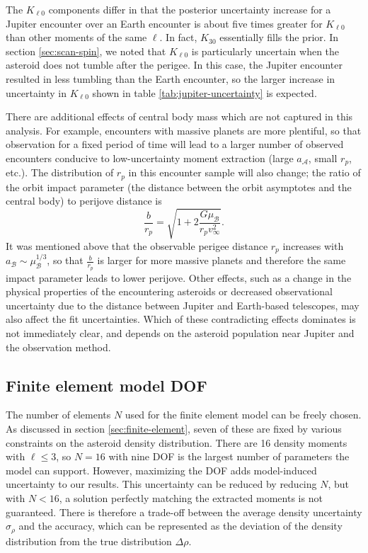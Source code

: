 \documentclass[fleqn,usenatbib]{mnras}
\begin{document}
The $K_{\ell 0}$ components differ in that the posterior uncertainty increase for a Jupiter encounter over an Earth encounter is about five times greater for $K_{\ell 0}$ than other moments of the same $\ell$. In fact, $K_{30}$ essentially fills the prior. In section \ref{sec:scan-spin}, we noted that $K_{\ell 0}$ is particularly uncertain when the asteroid does not tumble after the perigee. In this case, the Jupiter encounter resulted in less tumbling than the Earth encounter, so the larger increase in uncertainty in $K_{\ell 0}$ shown in table \ref{tab:jupiter-uncertainty} is expected.

There are additional effects of central body mass which are not captured in this analysis. For example, encounters with massive planets are more plentiful, so that observation for a fixed period of time will lead to a larger number of observed encounters conducive to low-uncertainty moment extraction (large $a_\mathcal{A}$, small $r_p$, etc.). The distribution of $r_p$ in this encounter sample will also change; the ratio of the orbit impact parameter (the distance between the orbit asymptotes and the central body) to perijove distance is 
\begin{equation}
  \frac{b}{r_p} = \sqrt{1+2\frac{G\mu_\mathcal{B}}{r_p v_\infty^2}}.
\end{equation}
It was mentioned above that the observable perigee distance $r_p$ increases with $a_\mathcal{B} \sim \mu_\mathcal{B}^{1/3}$, so that $\frac{b}{r_p}$ is larger for more massive planets and therefore the same impact parameter leads to lower perijove. Other effects, such as a change in the physical properties of the encountering asteroids or decreased observational uncertainty due to the distance between Jupiter and Earth-based telescopes, may also affect the fit uncertainties. Which of these contradicting effects dominates is not immediately clear, and depends on the asteroid population near Jupiter and the observation method.



\subsection{Finite element model DOF}
The number of elements $N$ used for the finite element model can be freely chosen. As discussed in section \ref{sec:finite-element}, seven of these are fixed by various constraints on the asteroid density distribution. There are 16 density moments with $\ell \leq 3$, so $N=16$ with nine DOF is the largest number of parameters the model can support. However, maximizing the DOF adds model-induced uncertainty to our results. This uncertainty can be reduced by reducing $N$, but with $N < 16$, a solution perfectly matching the extracted moments is not guaranteed. There is therefore a trade-off between the average density uncertainty $\sigma_\rho$ and the accuracy, which can be represented as the deviation of the density distribution from the true distribution $\Delta \rho$.
\end{document}
